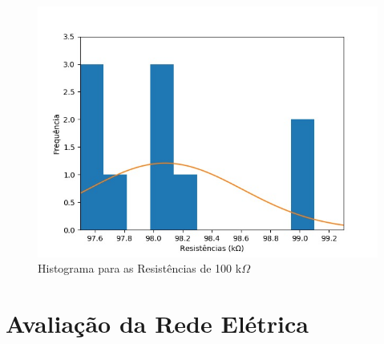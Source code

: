 \documentclass[14pt, oneside]{book}
\theoremstyle{definition}
\begin{document}
            \begin{figure}[H]
                \centering
                \includegraphics[scale= 0.5]{1.jpg}
                \caption{Histograma para as Resistências de 100 k$\Omega$}
                \label{fig:my_label7}
            \end{figure}
            
            
            \section{Avaliação da Rede Elétrica}
    
\end{document}
